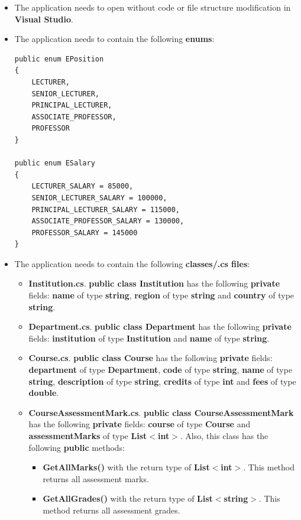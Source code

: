 \documentclass{article}
\begin{document}
\begin{itemize}
    \item The application needs to open without code or file structure modification in \textbf{Visual Studio}.
    \item The application needs to contain the following \textbf{enums}:
    \begin{verbatim}
public enum EPosition
{
    LECTURER,
    SENIOR_LECTURER,
    PRINCIPAL_LECTURER,
    ASSOCIATE_PROFESSOR,
    PROFESSOR
}
            
public enum ESalary
{
    LECTURER_SALARY = 85000,
    SENIOR_LECTURER_SALARY = 100000,
    PRINCIPAL_LECTURER_SALARY = 115000,
    ASSOCIATE_PROFESSOR_SALARY = 130000,
    PROFESSOR_SALARY = 145000
}
    \end{verbatim}
    \item The application needs to contain the following \textbf{classes/.cs files}:
    \begin{itemize}
        \item \textbf{Institution.cs}. \textbf{public class Institution} has the following \textbf{private} fields: \textbf{name} of type \textbf{string}, \textbf{region} of type \textbf{string} and \textbf{country} of type \textbf{string}. 
        \item \textbf{Department.cs}. \textbf{public class Department} has the following \textbf{private} fields: \textbf{institution} of type \textbf{Institution} and \textbf{name} of type \textbf{string}.
        \item \textbf{Course.cs}. \textbf{public class Course} has the following \textbf{private} fields: \textbf{department} of type \textbf{Department}, \textbf{code} of type \textbf{string}, \textbf{name} of type \textbf{string}, \textbf{description} of type \textbf{string}, \textbf{credits} of type \textbf{int} and \textbf{fees} of type \textbf{double}.
        \item \textbf{CourseAssessmentMark.cs}. \textbf{public class CourseAssessmentMark} has the following \textbf{private} fields: \textbf{course} of type \textbf{Course} and \textbf{assessmentMarks} of type \textbf{List$<$int$>$}. Also, this class has the following \textbf{public} methods:
        \begin{itemize}
            \item \textbf{GetAllMarks()} with the return type of \textbf{List$<$int$>$}. This method returns all assessment marks.
            \item \textbf{GetAllGrades()} with the return type of \textbf{List$<$string$>$}. This method returns all assessment grades.

\end{itemize}
\end{itemize}
\end{itemize}
\end{document}
